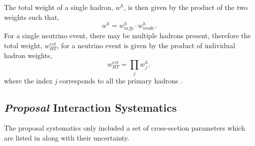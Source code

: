 The total weight of a single hadron, $w^h$, is then given by the product of the two weights such that,
\begin{equation}
    w^h = w^h_{mfp} \cdot w^h_{mode}.
\end{equation}
For a single neutrino event, there may be multiple hadrons present, therefore the total weight, $w^{evt}_{HT}$, for a neutrino event is given by the product of individual hadron weights,
\begin{equation}
    w_{HT}^{evt} = \prod_j w_j^h,
\end{equation}
where the index \textit{j} corresponds to all the primary hadrons \cite{GENIE_manual}.

\subsection*{\textit{Proposal} Interaction Systematics}

The proposal systematics only included a set of cross-section parameters which are listed in  along with their uncertainty. 

